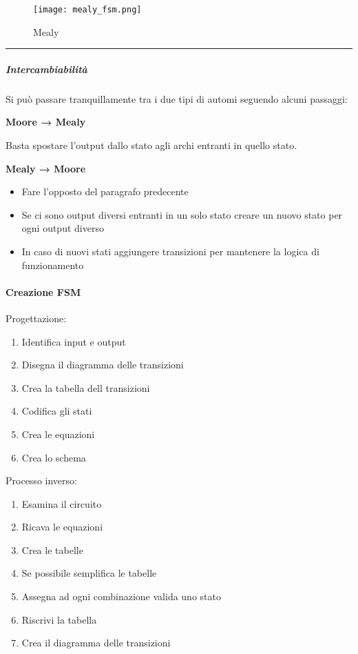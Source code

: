 \documentclass{article}
\begin{document}
\begin{figure}[ht]
    \centering
    \texttt{[image: mealy\_fsm.png]}
    \caption{Mealy}
    \label{fig:mealy}
\end{figure}

\noindent\rule{\textwidth}{0.5pt}

\subparagraph{Intercambiabilità}

Si può passare tranquillamente tra i due tipi di automi seguendo alcuni passaggi:\newline

\textbf{Moore → Mealy}

\vspace{5pt}

Basta spostare l'output dallo stato agli archi entranti in quello stato.\newline

\textbf{Mealy → Moore}

\begin{itemize}
    \item Fare l'opposto del paragrafo predecente
    \item Se ci sono output diversi entranti in un solo stato creare un nuovo stato per ogni output diverso
    \item In caso di nuovi stati aggiungere transizioni per mantenere la logica di funzionamento
\end{itemize}

\newpage

\paragraph{Creazione FSM}

Progettazione:
\begin{enumerate}
    \item Identifica input e output
    \item Disegna il diagramma delle transizioni
    \item Crea la tabella dell transizioni
    \item Codifica gli stati
    \item Crea le equazioni
    \item Crea lo schema
\end{enumerate}

Processo inverso:
\begin{enumerate}
    \item Esamina il circuito
    \item Ricava le equazioni
    \item Crea le tabelle
    \item Se possibile semplifica le tabelle
    \item Assegna ad ogni combinazione valida uno stato
    \item Riscrivi la tabella
    \item Crea il diagramma delle transizioni
\end{enumerate}
\end{document}
